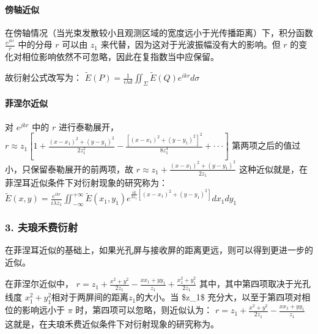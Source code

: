 \documentclass[letterpaper,10pt,english]{sphinxmanual}
\begin{document}
\paragraph{傍轴近似}
\label{\detokenize{_u7b80_u4ecb/_u6838_u5fc3_u8bbe_u8ba1_u4f18_u5316_u7b97_u6cd5/_u8fdc_u573a_u4f20_u64ad_u6a21_u5757/contents:id4}}
\sphinxAtStartPar


\sphinxAtStartPar
{}





\sphinxAtStartPar
在傍轴情况（当光束发散较小且观测区域的宽度远小于光传播距离）下，积分函数 \(\frac{e^{jkr}}{r}\) 中的分母 \(r\) 可以由 \(z_1\) 来代替，因为这对于光波振幅没有大的影响。但 \(r\)  的变化对相位影响依然不可忽略，因此在复指数当中应保留。

\sphinxAtStartPar
故衍射公式改写为：
\(\tilde{E}(P)=\frac{1}{i\lambda d}\iint_{\Sigma}{\tilde{E}(Q)e^{ikr}d\sigma}\)


\paragraph{菲涅尔近似}
\label{\detokenize{_u7b80_u4ecb/_u6838_u5fc3_u8bbe_u8ba1_u4f18_u5316_u7b97_u6cd5/_u8fdc_u573a_u4f20_u64ad_u6a21_u5757/contents:id5}}
\sphinxAtStartPar
对 \(e^{jkr}\) 中的 \(r\) 进行泰勒展开，
\(r\approx z_1[1+\frac{(x-x_1)^2+(y-y_1)^2}{2z_1^2}-\frac{[(x-x_1)^2+(y-y_1)^2]^2}{8z_1^4}+\cdot\cdot\cdot]\)
第两项之后的值过小，只保留泰勒展开的前两项，故
\(r\approx z_1+\frac{(x-x_1)^2+(y-y_1)^2}{2z_1}\)
这种近似就是，在菲涅耳近似条件下对衍射现象的研究称为：
\(\tilde{E}(x,y)=\frac{e^{ikr}}{i\lambda z_1}\iint_{-\infty}^{+\infty}{\tilde{E}(x_1,y_1)e^{\frac{ik}{2z_1}[(x-x_1)^2+(y-y_1)^2]}dx_1dy_1}\)


\subsubsection{3. 夫琅禾费衍射}
\label{\detokenize{_u7b80_u4ecb/_u6838_u5fc3_u8bbe_u8ba1_u4f18_u5316_u7b97_u6cd5/_u8fdc_u573a_u4f20_u64ad_u6a21_u5757/contents:id6}}
\sphinxAtStartPar
在菲涅耳近似的基础上，如果光孔屏与接收屏的距离更远，则可以得到更进一步的近似。

\sphinxAtStartPar
在菲涅尔近似中，
\(r= z_1+\frac{x^2+y^2}{2z_1}-\frac{xx_1+yy_1}{z_1}+\frac{x_1^2+y_1^2}{2z_1}\)
其中，其中第四项取决于光孔线度 \(x_1^2+y_1^2\)相对于两屏间的距离\(z_1\)的大小。当 \$z\_1\$ 充分大，以至于第四项对相位的影响远小于 \(\pi\) 时，第四项可以忽略，则近似认为：
\(r= z_1+\frac{x^2+y^2}{2z_1}-\frac{xx_1+yy_1}{z_1}\)
这就是，在夫琅禾费近似条件下对衍射现象的研究称为。
\end{document}
